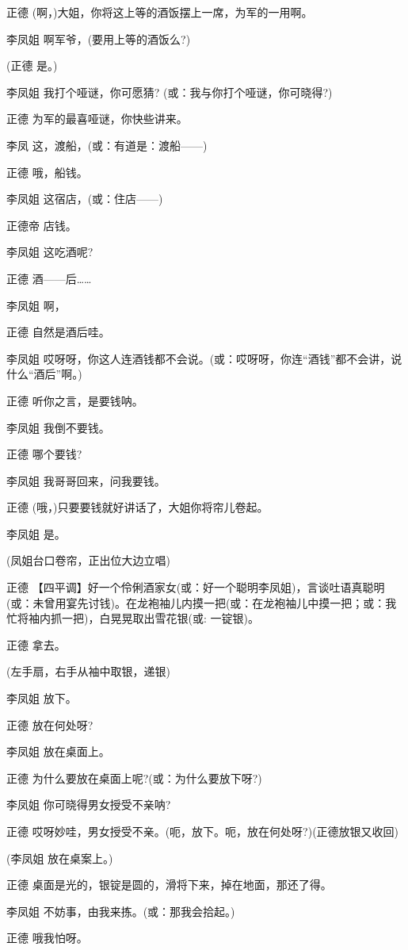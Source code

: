 正德 (啊，)大姐，你将这上等的酒饭摆上一席，为军的一用啊。

李凤姐 啊军爷，(要用上等的酒饭么?)

(正德 是。)

李凤姐 我打个哑谜，你可愿猜? (或：我与你打个哑谜，你可晓得?)

正德 为军的最喜哑谜，你快些讲来。

李凤 这，渡船，(或：有道是：渡船------)

正德 哦，船钱。

李凤姐 这宿店，(或：住店------)

正德帝 店钱。

李凤姐 这吃酒呢?

正德 酒------后\ldots{}\ldots{}

李凤姐 啊，

正德 自然是酒后哇。

李凤姐
哎呀呀，你这人连酒钱都不会说。(或：哎呀呀，你连``酒钱''都不会讲，说什么``酒后''啊。)

正德 听你之言，是要钱呐。

李凤姐 我倒不要钱。

正德 哪个要钱?

李凤姐 我哥哥回来，问我要钱。

正德 (哦，)只要要钱就好讲话了，大姐你将帘儿卷起。

李凤姐 是。

(凤姐台口卷帘，正出位大边立唱)

正德
【四平调】好一个伶俐酒家女(或：好一个聪明李凤姐)，言谈吐语真聪明(或：未曾用宴先讨钱)。在龙袍袖儿内摸一把(或：在龙袍袖儿中摸一把；或：我忙将袖内抓一把)，白晃晃取出雪花银(或:
一锭银)。

正德 拿去。

(左手扇，右手从袖中取银，递银)

李凤姐 放下。

正德 放在何处呀?

李凤姐 放在桌面上。

正德 为什么要放在桌面上呢?(或：为什么要放下呀?)

李凤姐 你可晓得男女授受不亲呐?

正德 哎呀妙哇，男女授受不亲。(呃，放下。呃，放在何处呀?)(正德放银又收回)

(李凤姐 放在桌案上。)

正德 桌面是光的，银锭是圆的，滑将下来，掉在地面，那还了得。

李凤姐 不妨事，由我来拣。(或：那我会拾起。)

正德 哦我怕呀。

